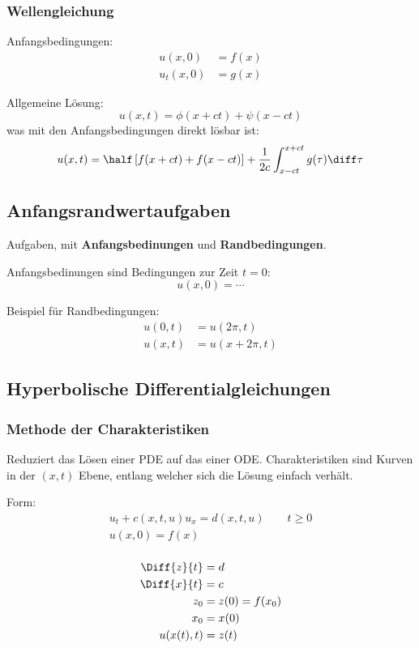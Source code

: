 		\subsubsection{Wellengleichung} %
			
			Anfangsbedingungen:
			\begin{align*}
				u(x,0) &= f(x) \\
				u_t(x,0) &= g(x)
			\end{align*}
			
			Allgemeine Lösung:
			\[
				u(x,t) = \phi(x+ct) + \psi(x-ct)
			\]
			was mit den Anfangsbedingungen direkt lösbar ist:
			\[
				u(x,t) = \half \left[
					f(x+ct) + f(x-ct)
				\right]
				+ \frac{1}{2c} \int_{x-ct}^{x+ct} g(\tau) \diff \tau
			\]
	\subsection{Anfangsrandwertaufgaben} %
		Aufgaben, mit \textbf{Anfangsbedinungen} und \textbf{Randbedingungen}.
		
		Anfangsbedinungen sind Bedingungen zur Zeit $t = 0$:
		\begin{equation*}
			u(x,0) = \cdots
		\end{equation*}
		
		Beispiel für Randbedingungen:
		\begin{align*}
			u(0,t) &= u(2\pi,t) \\
			u(x,t) &= u(x+2\pi,t)
		\end{align*}
	\subsection{Hyperbolische Differentialgleichungen} %
		\subsubsection{Methode der Charakteristiken} %
			Reduziert das Lösen einer PDE auf das einer ODE.
			Charakteristiken sind Kurven in der $(x,t)$ Ebene, entlang welcher sich
			die Lösung einfach verhält.
			
			Form:
			\begin{gather*}
				u_t + c(x,t,u) u_x = d(x,t,u) \qquad t \geq 0 \\
				u(x,0) = f(x) \\
			\end{gather*}
			
			\begin{align*}
				\Diff{z}{t} &= d \\
				\Diff{x}{t} &= c \\
				z_0 &= z(0) = f(x_0) \\
				x_0 &= x(0) \\
				u(x(t), t) &= z(t)
			\end{align*}
